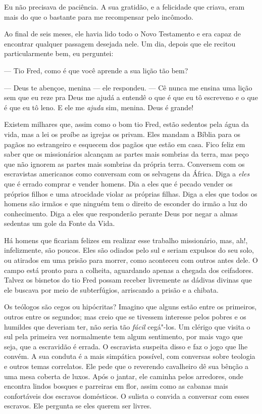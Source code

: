 Eu não precisava de paciência. A sua
gratidão, e a felicidade que criava, eram mais do que o bastante para me
recompensar pelo incômodo.

Ao final de seis meses, ele havia lido
todo o Novo Testamento e era capaz de encontrar qualquer passagem
desejada nele. Um dia, depois que ele recitou particularmente bem, eu
perguntei:

--- Tio Fred, como é que você aprende a sua lição tão bem?

--- Deus te abençoe, menina --- ele
respondeu. --- Cê nunca me ensina uma lição sem que eu reze pra Deus me
ajudá a entendê o que é que eu tô escreveno e o que é que eu tô leno. E
ele me \emph{ajuda} sim, menina. Deus é grande!

Existem milhares que, assim como o bom
tio Fred, estão sedentos pela água da vida, mas a lei os proíbe as
igrejas os privam. Eles mandam a Bíblia para os pagãos no estrangeiro e
esquecem dos pagãos que estão em casa. Fico feliz em saber que os
missionários alcançam as partes mais sombrias da terra, mas peço que não
ignorem as partes mais sombrias da própria terra. Conversem com os
escravistas americanos como conversam com os selvagens da África. Diga a
\emph{eles} que é errado comprar e vender homens. Dia a eles que é
pecado vender os próprios filhos e uma atrocidade violar as próprias
filhas. Diga a eles que todos os homens são irmãos e que ninguém tem o
direito de esconder do irmão a luz do conhecimento. Diga a eles que
responderão perante Deus por negar a almas sedentas um gole da Fonte da
Vida.

Há homens que ficariam felizes em
realizar esse trabalho missionário, mas, ah!, infelizmente, são poucos.
Eles são odiados pelo sul e seriam expulsos do seu solo, ou atirados em
uma prisão para morrer, como aconteceu com outros antes dele. O campo
está pronto para a colheita, aguardando apenas a chegada dos ceifadores.
Talvez os bisnetos do tio Fred possam receber livremente as dádivas
divinas que ele buscava por meio de subterfúgios, arriscando a prisão e
a chibata.

Os teólogos são cegos ou hipócritas?
Imagino que alguns estão entre os primeiros, outros entre os segundos;
mas creio que se tivessem interesse pelos pobres e os humildes que
deveriam ter, não seria tão \emph{fácil} cegá"-los. Um clérigo que visita
o sul pela primeira vez normalmente tem algum sentimento, por mais vago
que seja, que a escravidão é errada. O escravista suspeita disso e faz o
jogo que lhe convém. A sua conduta é a mais simpática possível, com
conversas sobre teologia e outros temas correlatos. Ele pede que o
reverendo cavalheiro dê sua bênção a uma mesa coberta de luxos. Após o
jantar, ele caminha pelos arredores, onde encontra lindos bosques e
parreiras em flor, assim como as cabanas mais confortáveis dos escravos
domésticos. O sulista o convida a conversar com esses escravos. Ele
pergunta se eles querem ser livres.

